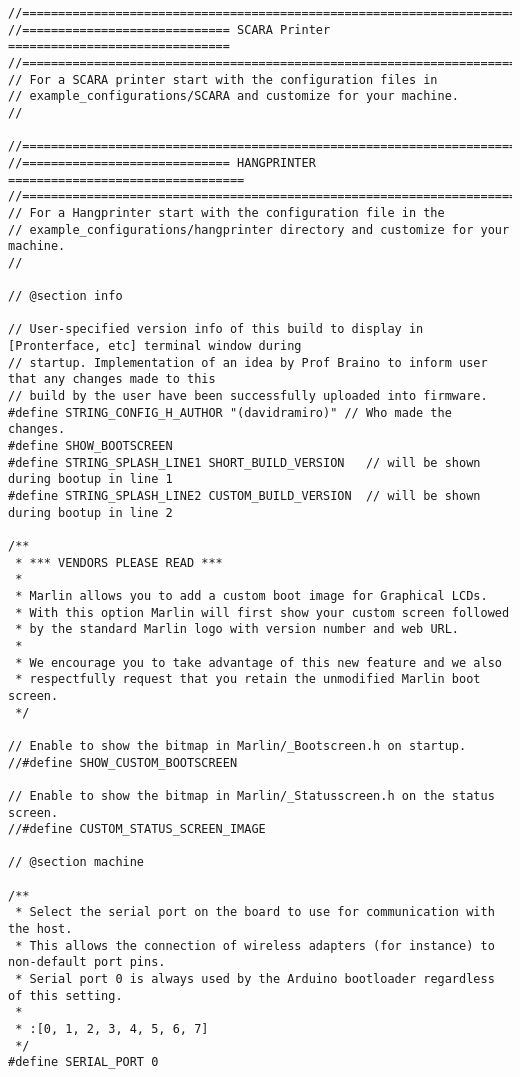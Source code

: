\begin{lstlisting}
//===========================================================================
//============================= SCARA Printer ===============================
//===========================================================================
// For a SCARA printer start with the configuration files in
// example_configurations/SCARA and customize for your machine.
//

//===========================================================================
//============================= HANGPRINTER =================================
//===========================================================================
// For a Hangprinter start with the configuration file in the
// example_configurations/hangprinter directory and customize for your machine.
//

// @section info

// User-specified version info of this build to display in [Pronterface, etc] terminal window during
// startup. Implementation of an idea by Prof Braino to inform user that any changes made to this
// build by the user have been successfully uploaded into firmware.
#define STRING_CONFIG_H_AUTHOR "(davidramiro)" // Who made the changes.
#define SHOW_BOOTSCREEN
#define STRING_SPLASH_LINE1 SHORT_BUILD_VERSION   // will be shown during bootup in line 1
#define STRING_SPLASH_LINE2 CUSTOM_BUILD_VERSION  // will be shown during bootup in line 2

/**
 * *** VENDORS PLEASE READ ***
 *
 * Marlin allows you to add a custom boot image for Graphical LCDs.
 * With this option Marlin will first show your custom screen followed
 * by the standard Marlin logo with version number and web URL.
 *
 * We encourage you to take advantage of this new feature and we also
 * respectfully request that you retain the unmodified Marlin boot screen.
 */

// Enable to show the bitmap in Marlin/_Bootscreen.h on startup.
//#define SHOW_CUSTOM_BOOTSCREEN

// Enable to show the bitmap in Marlin/_Statusscreen.h on the status screen.
//#define CUSTOM_STATUS_SCREEN_IMAGE

// @section machine

/**
 * Select the serial port on the board to use for communication with the host.
 * This allows the connection of wireless adapters (for instance) to non-default port pins.
 * Serial port 0 is always used by the Arduino bootloader regardless of this setting.
 *
 * :[0, 1, 2, 3, 4, 5, 6, 7]
 */
#define SERIAL_PORT 0


\end{lstlisting}
